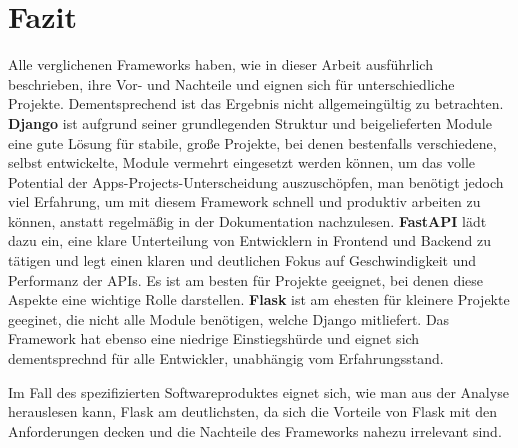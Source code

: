 \documentclass[letterpaper,11pt,leqno]{article}
\begin{document}
\section{Fazit}
Alle verglichenen Frameworks haben, wie in dieser Arbeit ausführlich beschrieben, ihre Vor- und
Nachteile und eignen sich für unterschiedliche Projekte. Dementsprechend ist das Ergebnis nicht
allgemeingültig zu betrachten. \textbf{Django} ist aufgrund seiner grundlegenden Struktur und
beigelieferten Module eine gute Lösung für stabile, große Projekte, bei denen bestenfalls
verschiedene, selbst entwickelte, Module vermehrt eingesetzt werden können, um das volle Potential
der Apps-Projects-Unterscheidung auszuschöpfen, man benötigt jedoch viel Erfahrung, um mit diesem
Framework schnell und produktiv arbeiten zu können, anstatt regelmäßig in der Dokumentation
nachzulesen. \textbf{FastAPI} lädt dazu ein, eine klare Unterteilung von Entwicklern in Frontend und
Backend zu tätigen und legt einen klaren und deutlichen Fokus auf Geschwindigkeit und Performanz
der APIs. Es ist am besten für Projekte geeignet, bei denen diese Aspekte eine wichtige Rolle
darstellen. \textbf{Flask} ist am ehesten für kleinere Projekte geeginet, die nicht alle Module
benötigen, welche Django mitliefert. Das Framework hat ebenso eine niedrige Einstiegshürde und
eignet sich dementsprechnd für alle Entwickler, unabhängig vom Erfahrungsstand.

Im Fall des spezifizierten Softwareproduktes eignet sich, wie man aus der Analyse herauslesen kann,
Flask am deutlichsten, da sich die Vorteile von Flask mit den Anforderungen decken und die Nachteile
des Frameworks nahezu irrelevant sind.
\clearpage
\end{document}
